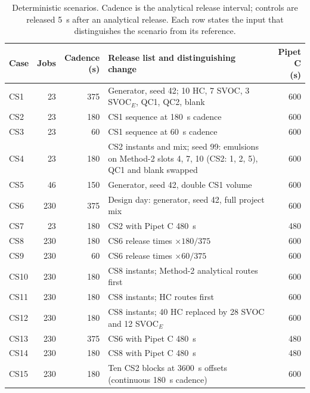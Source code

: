 \begin{table}[tbp]
\caption{Deterministic scenarios. Cadence is the analytical release interval; controls are released 5~s after an analytical release. Each row states the input that distinguishes the scenario from its reference.\label{tab:cases}}
\centering
\footnotesize
\begin{tabular}{lrrp{8.6cm}r}
\toprule
Case & Jobs & \shortstack{Cadence\\(s)} & Release list and distinguishing change & \shortstack{Pipet C\\(s)}\\
\midrule
CS1 & 23 & 375 & Generator, seed 42; 10 HC, 7 SVOC, 3 SVOC$_E$, QC1, QC2, blank & 600\\
CS2 & 23 & 180 & CS1 sequence at 180~s cadence & 600\\
CS3 & 23 & 60 & CS1 sequence at 60~s cadence & 600\\
CS4 & 23 & 180 & CS2 instants and mix; seed 99: emulsions on Method-2 slots 4, 7, 10 (CS2: 1, 2, 5), QC1 and blank swapped & 600\\
CS5 & 46 & 150 & Generator, seed 42, double CS1 volume & 600\\
CS6 & 230 & 375 & Design day: generator, seed 42, full project mix & 600\\
CS7 & 23 & 180 & CS2 with Pipet C 480~s & 480\\
CS8 & 230 & 180 & CS6 release times $\times180/375$ & 600\\
CS9 & 230 & 60 & CS6 release times $\times60/375$ & 600\\
CS10 & 230 & 180 & CS8 instants; Method-2 analytical routes first & 600\\
CS11 & 230 & 180 & CS8 instants; HC routes first & 600\\
CS12 & 230 & 180 & CS8 instants; 40 HC replaced by 28 SVOC and 12 SVOC$_E$ & 600\\
CS13 & 230 & 375 & CS6 with Pipet C 480~s & 480\\
CS14 & 230 & 180 & CS8 with Pipet C 480~s & 480\\
CS15 & 230 & 180 & Ten CS2 blocks at 3600~s offsets (continuous 180~s cadence) & 600\\
\bottomrule
\end{tabular}
\end{table}
